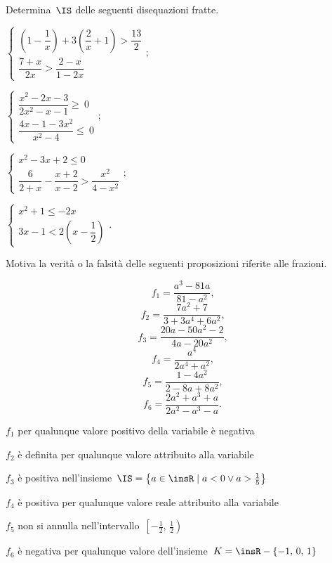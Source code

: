 \begin{esercizio}[\Ast]
\label{ese:21.68}
Determina~$\IS$ delle seguenti disequazioni fratte.
\begin{multicols}{2}
\begin{enumeratea}{\longarray
 \item $\left\{\begin{array}{l}
		\left(1-\dfrac{1}{x}\right)+3\left(\dfrac{2}{x}+1\right)>\dfrac{13}{2}\\
		\dfrac{7+x}{2x}>\dfrac{2-x}{1-2x}
   \end{array}\right.;$
\item $\left\{\begin{array}{l}
		\dfrac{x^{2}-2x-3}{2x^{2}-x-1}\ge~0\\
		\dfrac{4x-1-3x^{2}}{x^{2}-4}\le~0
	\end{array}\right.;$
\item $\left\{\begin{array}{l}
		x^{2}-3x+2\le0\\
		\dfrac{6}{2+x}-\dfrac{x+2}{x-2}>\dfrac{x^{2}}{4-x^{2}}
	\end{array}\right.;$
\item $\left\{\begin{array}{l}
		x^{2}+1\le -2x\\
		3x-1<2\left(x-\dfrac{1}{2}\right)
		\end{array}\right..$}
\end{enumeratea}
\end{multicols}
\end{esercizio}

\begin{esercizio}
\label{ese:21.69}
Motiva la verità o la falsità delle seguenti
proposizioni riferite alle frazioni.
\begin{multicols}{3}
\noindent\[f_{1}=\frac{a^{3}-81a}{81-a^{2}}\text{,}\]
\[f_{2}=\frac{7a^{2}+7}{3+3a^{4}+6a^{2}}\text{,}\]
\[f_{3}=\frac{20a-50a^{2}-2}{4a-20a^{2}}\text{,}\]
\[f_{4}=\frac{a^{4}}{2a^{4}+a^{2}}\text{,}\]
\[f_{5}=\frac{1-4a^{2}}{2-8a+8a^{2}}\text{,}\]
\[f_{6}=\frac{2a^{2}+a^{3}+a}{2a^{2}-a^{3}-a}.\]
\end{multicols}
\begin{enumeratea}
\TabPositions{11cm}
\item $f_{1}$ per qualunque valore positivo della variabile è negativa \tab\boxV\quad\boxF
\item $f_{2}$ è definita per qualunque valore attribuito alla variabile \tab\boxV\quad\boxF
\item $f_{3}$ è positiva nell'insieme~$\IS=\left\{a\in \insR\;|\;a<0\vee a>\frac{1}{5}\right\}$ \tab\boxV\quad\boxF
\item $f_{4}$ è positiva per qualunque valore reale attribuito alla variabile \tab\boxV\quad\boxF
\item $f_{5}$ non si annulla nell'intervallo~$\left[-\frac{1}{2}\text{,~}\frac{1}{2}\right)$ \tab\boxV\quad\boxF
\item $f_{6}$ è negativa per qualunque valore dell'insieme~$K=\insR-\{-1\text{,~}0\text{,~}1\}$ \tab\boxV\quad\boxF
\end{enumeratea}
\end{esercizio}

